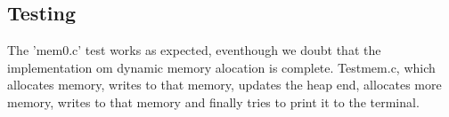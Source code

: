 \documentclass[12pt]{article}
\begin{document}
\subsection*{Testing}
The 'mem0.c' test works as expected, eventhough we doubt that the implementation om dynamic memory alocation is complete. Testmem.c, which allocates memory, writes to that memory, updates the heap end, allocates more memory, writes to that memory and finally tries to print it to the terminal.
\end{document}
